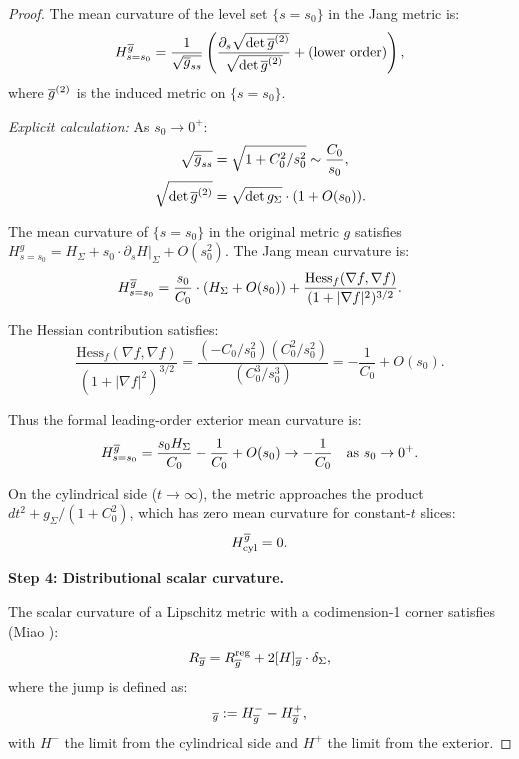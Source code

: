 \begin{proof}
The mean curvature of the level set $\{s = s_0\}$ in the Jang metric is:
\begin{equation}\label{eq:MCFormula}
    H^{\overline{g}}_{s=s_0} = \frac{1}{\sqrt{\overline{g}_{ss}}} \left( \frac{\partial_s \sqrt{\det \overline{g}^{(2)}}}{\sqrt{\det \overline{g}^{(2)}}} + \text{(lower order)} \right),
\end{equation}
where $\overline{g}^{(2)}$ is the induced metric on $\{s = s_0\}$.

\textit{Explicit calculation:} As $s_0 \to 0^+$:
\begin{align}
    \sqrt{\overline{g}_{ss}} &= \sqrt{1 + C_0^2/s_0^2} \sim \frac{C_0}{s_0}, \\
    \sqrt{\det \overline{g}^{(2)}} &= \sqrt{\det g_\Sigma} \cdot (1 + O(s_0)).
\end{align}

The mean curvature of $\{s = s_0\}$ in the original metric $g$ satisfies $H^g_{s=s_0} = H_\Sigma + s_0 \cdot \partial_s H|_\Sigma + O(s_0^2)$. The Jang mean curvature is:
\begin{equation}
    H^{\overline{g}}_{s=s_0} = \frac{s_0}{C_0} \cdot (H_\Sigma + O(s_0)) + \frac{\text{Hess}_f(\nabla f, \nabla f)}{(1 + |\nabla f|^2)^{3/2}}.
\end{equation}

The Hessian contribution satisfies:
\begin{equation}
    \frac{\text{Hess}_f(\nabla f, \nabla f)}{(1 + |\nabla f|^2)^{3/2}} = \frac{(-C_0/s_0^2)(C_0^2/s_0^2)}{(C_0^3/s_0^3)} = -\frac{1}{C_0} + O(s_0).
\end{equation}

Thus the formal leading-order exterior mean curvature is:
\begin{equation}\label{eq:MCExterior}
    H^{\overline{g}}_{s=s_0} = \frac{s_0 H_\Sigma}{C_0} - \frac{1}{C_0} + O(s_0) \to -\frac{1}{C_0} \quad \text{as } s_0 \to 0^+.
\end{equation}

On the cylindrical side ($t \to \infty$), the metric approaches the product $dt^2 + g_\Sigma/(1+C_0^2)$, which has zero mean curvature for constant-$t$ slices:
\begin{equation}\label{eq:MCCylinder}
    H^{\overline{g}}_{\text{cyl}} = 0.
\end{equation}

\textbf{Step 4: Distributional scalar curvature.}

The scalar curvature of a Lipschitz metric with a codimension-1 corner satisfies (Miao \cite{miao2002}):
\begin{equation}\label{eq:DistrScalar-app}
    R_{\overline{g}} = R^{\text{reg}}_{\overline{g}} + 2[H]_{\overline{g}} \cdot \delta_\Sigma,
\end{equation}
where the jump is defined as:
\begin{equation}
    [H]_{\bg} := H^-_{\bg} - H^+_{\bg},
\end{equation}
with $H^-$ the limit from the cylindrical side and $H^+$ the limit from the exterior.


\end{proof}
